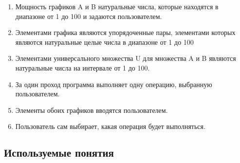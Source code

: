 \documentclass[a4paper,12pt]{extarticle}
\begin{document}
\begin{enumerate}
  \item Мощность графиков A и B натуральные числа, которые находятся в диапазоне от 1 до 100 и задаются пользователем.
  \item Элементами графика являются упорядоченные пары, элементами которых являются натуральные целые числа в диапазоне от 1 до 100
  \item Элементами универсального множества U для множества A и B являются натуральные числа на интервале от 1 до 100.
  \item За один проход программа выполняет одну операцию, выбранную пользователем.
  \item Элементы обоих графиков вводятся пользователем.
  \item Пользователь сам выбирает, какая операция будет выполняться.
\end{enumerate}
\begin{center}
\section*{Используемые понятия}
\end{center}
\end{document}

